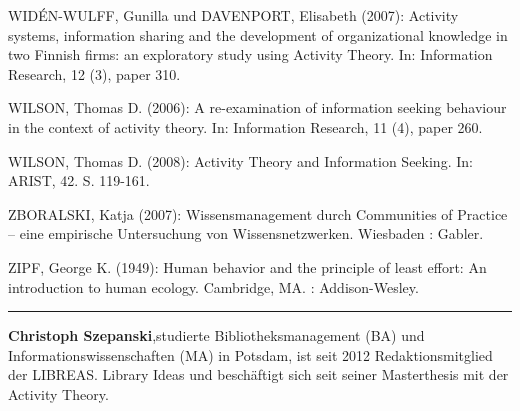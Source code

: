 \documentclass[a4paper,
fontsize=11pt,
oneside,
numbers=noperiodatend,
parskip=half-,
bibliography=totoc,
final
]{scrartcl}
\begin{document}
WIDÉN-WULFF, Gunilla und DAVENPORT, Elisabeth (2007): Activity systems,
information sharing and the development of organizational knowledge in
two Finnish firms: an exploratory study using Activity Theory. In:
Information Research, 12 (3), paper 310.

WILSON, Thomas D. (2006): A re-examination of information seeking
behaviour in the context of activity theory. In: Information Research,
11 (4), paper 260.

WILSON, Thomas D. (2008): Activity Theory and Information Seeking. In:
ARIST, 42. S. 119-161.

ZBORALSKI, Katja (2007): Wissensmanagement durch Communities of Practice
-- eine empirische Untersuchung von Wissensnetzwerken. Wiesbaden :
Gabler.

ZIPF, George K. (1949): Human behavior and the principle of least
effort: An introduction to human ecology. Cambridge, MA. :
Addison-Wesley.

\begin{center}\rule{0.5\linewidth}{\linethickness}\end{center}

\textbf{Christoph Szepanski},studierte Bibliotheksmanagement (BA) und
Informationswissenschaften (MA) in Potsdam, ist seit 2012
Redaktionsmitglied der LIBREAS. Library Ideas und beschäftigt sich seit
seiner Masterthesis mit der Activity Theory.
\end{document}
